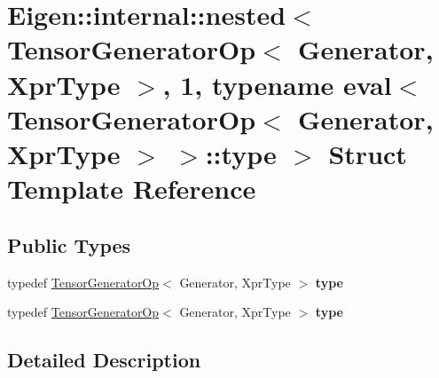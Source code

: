 \hypertarget{struct_eigen_1_1internal_1_1nested_3_01_tensor_generator_op_3_01_generator_00_01_xpr_type_01_4_0384769220adcc2cd0a85c8ada993f368}{}\section{Eigen\+:\+:internal\+:\+:nested$<$ Tensor\+Generator\+Op$<$ Generator, Xpr\+Type $>$, 1, typename eval$<$ Tensor\+Generator\+Op$<$ Generator, Xpr\+Type $>$ $>$\+:\+:type $>$ Struct Template Reference}
\label{struct_eigen_1_1internal_1_1nested_3_01_tensor_generator_op_3_01_generator_00_01_xpr_type_01_4_0384769220adcc2cd0a85c8ada993f368}
\subsection*{Public Types}
\begin{DoxyCompactItemize}
\item 
\mbox{\label{struct_eigen_1_1internal_1_1nested_3_01_tensor_generator_op_3_01_generator_00_01_xpr_type_01_4_0384769220adcc2cd0a85c8ada993f368_af59d86ac518bbdd45ab1cb6faf9b532d}} 
typedef \hyperlink{class_eigen_1_1_tensor_generator_op}{Tensor\+Generator\+Op}$<$ Generator, Xpr\+Type $>$ {\bfseries type}
\item 
\mbox{\label{struct_eigen_1_1internal_1_1nested_3_01_tensor_generator_op_3_01_generator_00_01_xpr_type_01_4_0384769220adcc2cd0a85c8ada993f368_af59d86ac518bbdd45ab1cb6faf9b532d}} 
typedef \hyperlink{class_eigen_1_1_tensor_generator_op}{Tensor\+Generator\+Op}$<$ Generator, Xpr\+Type $>$ {\bfseries type}
\end{DoxyCompactItemize}


\subsection{Detailed Description}
